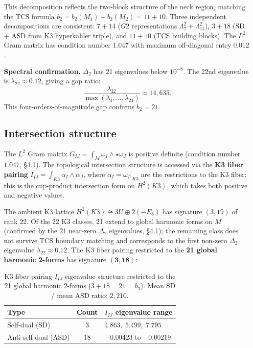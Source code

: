 \documentclass[11pt,a4paper]{article}
\newcommand{\Gtwo}{\mathrm{G}_2}
\def\Gtwo{G2}%
\begin{document}
This decomposition reflects the two-block structure of the neck region, matching the TCS formula $b_2 = b_2(M_1) + b_2(M_2) = 11 + 10$. Three independent decompositions are consistent: $7 + 14$ ($\Gtwo$ representations $\Lambda^2_7 + \Lambda^2_{14}$), $3 + 18$ (SD + ASD from K3 hyperk\"ahler triple), and $11 + 10$ (TCS building blocks). The $L^2$ Gram matrix has condition number $1.047$ with maximum off-diagonal entry $0.012$.

\textbf{Spectral confirmation.} $\Delta_2$ has 21 eigenvalues below $10^{-8}$. The 22nd eigenvalue is $\lambda_{22} \approx 0.12$, giving a gap ratio:
\begin{equation}
\frac{\lambda_{22}}{\max(\lambda_1, \ldots, \lambda_{21})} \approx 14{,}635.
\end{equation}
This four-orders-of-magnitude gap confirms $b_2 = 21$.

\subsection{Intersection structure}

The $L^2$ Gram matrix $G_{IJ} = \int_M \omega_I \wedge \star\omega_J$ is positive definite (condition number $1.047$, §4.1). The topological intersection structure is accessed via the \textbf{K3 fiber pairing} $I_{IJ} = \int_{K3} \alpha_I \wedge \alpha_J$, where $\alpha_I = \omega_I|_{K3}$ are the restrictions to the K3 fiber: this is the cup-product intersection form on $H^2(K3)$, which takes both positive and negative values.

The ambient K3 lattice $H^2(K3) \cong 3U \oplus 2(-E_8)$ has signature $(3, 19)$ of rank 22. Of the 22 K3 classes, 21 extend to global harmonic forms on $M$ (confirmed by the 21 near-zero $\Delta_2$ eigenvalues, §4.1); the remaining class does not survive TCS boundary matching and corresponds to the first non-zero $\Delta_2$ eigenvalue $\lambda_{22} \approx 0.12$. The K3 fiber pairing restricted to the \textbf{21 global harmonic 2-forms} has signature $\mathbf{(3, 18)}$:

\begin{table}[ht]
\centering
\begin{tabular}{lcl}
\toprule
Type & Count & $I_{IJ}$ eigenvalue range \\
\midrule
Self-dual (SD) & 3 & $4.863,\; 5.499,\; 7.795$ \\
Anti-self-dual (ASD) & 18 & $-0.00423$ to $-0.00219$ \\
\bottomrule
\end{tabular}
\caption{K3 fiber pairing $I_{IJ}$ eigenvalue structure restricted to the 21 global harmonic 2-forms ($3 + 18 = 21 = b_2$). Mean SD / mean ASD ratio: $2{,}210$.}
\label{tab:intersection}
\end{table}
\end{document}
